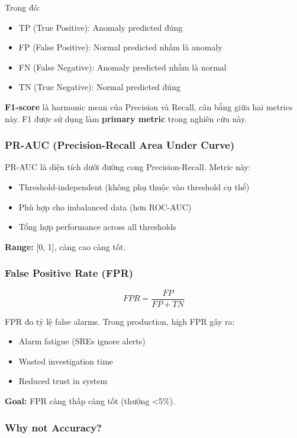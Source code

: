 Trong đó:
\begin{itemize}
    \item TP (True Positive): Anomaly predicted đúng
    \item FP (False Positive): Normal predicted nhầm là anomaly
    \item FN (False Negative): Anomaly predicted nhầm là normal
    \item TN (True Negative): Normal predicted đúng
\end{itemize}

\textbf{F1-score} là harmonic mean của Precision và Recall, cân bằng giữa hai metrics này. F1 được sử dụng làm \textbf{primary metric} trong nghiên cứu này.

\subsubsection{PR-AUC (Precision-Recall Area Under Curve)}

PR-AUC là diện tích dưới đường cong Precision-Recall. Metric này:
\begin{itemize}
    \item Threshold-independent (không phụ thuộc vào threshold cụ thể)
    \item Phù hợp cho imbalanced data (hơn ROC-AUC)
    \item Tổng hợp performance across all thresholds
\end{itemize}

\textbf{Range:} [0, 1], càng cao càng tốt.

\subsubsection{False Positive Rate (FPR)}

\begin{equation}
FPR = \frac{FP}{FP + TN}
\end{equation}

FPR đo tỷ lệ false alarms. Trong production, high FPR gây ra:
\begin{itemize}
    \item Alarm fatigue (SREs ignore alerts)
    \item Wasted investigation time
    \item Reduced trust in system
\end{itemize}

\textbf{Goal:} FPR càng thấp càng tốt (thường <5\%).

\subsubsection{Why not Accuracy?}

